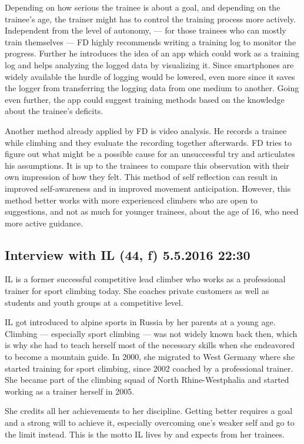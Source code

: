 Depending on how serious the trainee is about a goal, and depending on the trainee's age, the trainer might has to control the training process more actively. Independent from the level of autonomy, --- for those trainees who can mostly train themselves --- FD highly recommends writing a training log to monitor the progress. Further he introduces the idea of an app which could work as a training log and helps analyzing the logged data by visualizing it. Since smartphones are widely available the hurdle of logging would be lowered, even more since it saves the logger from transferring the logging data from one medium to another. Going even further, the app could suggest training methods based on the knowledge about the trainee's deficits.

Another method already applied by FD is video analysis. He records a trainee while climbing and they evaluate the recording together afterwards. FD tries to figure out what might be a possible cause for an unsuccessful try and articulates his assumptions. It is up to the trainees to compare this observation with their own impression of how they felt. This method of self reflection can result in improved self-awareness and in improved movement anticipation. However, this method better works with more experienced climbers who are open to suggestions, and not as much for younger trainees, about the age of 16, who need more active guidance.

\subsection{Interview with IL (44, f) 5.5.2016 22:30}
\label{appendix:interview_i_m}

IL is a former  successful competitive lead climber who works as a professional trainer for sport climbing today. She coaches private customers as well as students and youth groups at a competitive level.

IL got introduced to alpine sports in Russia by her parents at a young age. Climbing --- especially sport climbing --- was not widely known back then, which is why she had to teach herself most of the necessary skills when she endeavored to become a mountain guide. In 2000, she migrated to West Germany where she started training for sport climbing, since 2002 coached by a professional trainer. She became part of the climbing squad of North Rhine-Westphalia and started working as a trainer herself in 2005.

She credits all her achievements to her discipline. Getting better requires a goal and a strong will to achieve it, especially overcoming one's weaker self and go to the limit instead. This is the motto IL lives by and expects from her trainees.

